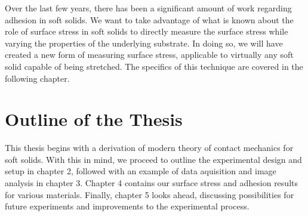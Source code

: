 Over the last few years, there has been a significant amount of work regarding adhesion in soft solids. We want to take advantage of what is known about the role of surface stress in soft solids to directly measure the surface stress while varying the properties of the underlying substrate. In doing so, we will have created a new form of measuring surface stress, applicable to virtually any soft solid capable of being stretched. The specifics of this technique are covered in the following chapter.

\section{Outline of the Thesis}
This thesis begins with a derivation of modern theory of contact mechanics for soft solids. With this in mind, we proceed to outline the experimental design and setup in chapter 2, followed with an example of data aquisition and image analysis in chapter 3. Chapter 4 contains our surface stress and adhesion results for various materials. Finally, chapter 5 looks ahead, discussing possibilities for future experiments and improvements to the experimental process.